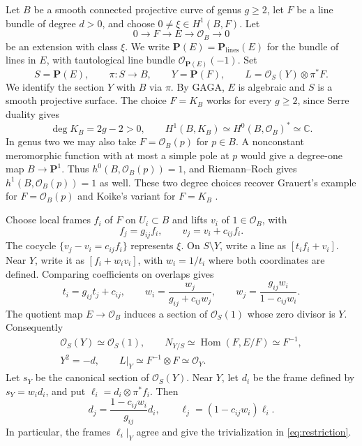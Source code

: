 \documentclass[11pt]{amsart}
\theoremstyle{definition}
\theoremstyle{remark}
\numberwithin{equation}{section}
\newcommand{\C}{\mathbb C}
\newcommand{\PP}{\mathbf P}
\newcommand{\OO}{\mathcal O}
\begin{document}
Let $B$ be a smooth connected projective curve of genus $g\ge2$, let
$F$ be a line bundle of degree $d>0$, and choose
$0\ne\xi\in H^1(B,F)$. Let
\begin{equation}\label{eq:extension-intro}
0\longrightarrow F\longrightarrow E\longrightarrow\OO_B
\longrightarrow0
\end{equation}
be an extension with class $\xi$. We write $\PP(E)=\PP_{\mathrm{lines}}(E)$ for the
bundle of lines in $E$, with tautological line bundle $\OO_{\PP(E)}(-1)$.
Set
\begin{equation}\label{eq:main-line}
 S=\PP(E),\qquad \pi:S\to B,\qquad
 Y=\PP(F),\qquad L=\OO_S(Y)\otimes\pi^*F.
\end{equation}
We identify the section $Y$ with $B$ via $\pi$. By GAGA, $E$ is
algebraic and $S$ is a smooth projective surface. The choice $F=K_B$
works for every $g\ge2$, since Serre duality gives
\[
 \deg K_B=2g-2>0,\qquad
 H^1(B,K_B)\simeq H^0(B,\OO_B)^*\simeq\C.
\]
In genus two we may also take $F=\OO_B(p)$ for $p\in B$.
A nonconstant meromorphic function with at most a simple pole at $p$
would give a degree-one map $B\to\PP^1$. Thus $h^0(B,\OO_B(p))=1$,
and Riemann--Roch gives $h^1(B,\OO_B(p))=1$ as well. These two
degree choices recover Grauert's example for $F=\OO_B(p)$
\cite[\S4, 8(d)]{Grauert1962} and Koike's variant for $F=K_B$
\cite[Example~4.1]{Koike2021}.

Choose local frames $f_i$ of $F$ on $U_i\subset B$ and lifts
$v_i$ of $1\in\OO_B$, with
\[
 f_j=g_{ij}f_i,\qquad v_j=v_i+c_{ij}f_i.
\]
The cocycle $\{v_j-v_i=c_{ij}f_i\}$ represents $\xi$.
On $S\setminus Y$, write a line as $[t_if_i+v_i]$. Near $Y$,
write it as $[f_i+w_iv_i]$, with $w_i=1/t_i$ where both coordinates
are defined. Comparing
coefficients on overlaps gives
\begin{equation}\label{eq:affine-transition}
 t_i=g_{ij}t_j+c_{ij},\qquad
 w_i=\frac{w_j}{g_{ij}+c_{ij}w_j},\qquad
 w_j=\frac{g_{ij}w_i}{1-c_{ij}w_i}.
\end{equation}
The quotient map $E\to\OO_B$ induces a section of
$\OO_S(1)$ whose zero divisor is $Y$. Consequently
\begin{equation}\label{eq:restriction}
 \begin{gathered}
 \OO_S(Y)\simeq\OO_S(1),\qquad
 N_{Y/S}\simeq\operatorname{Hom}(F,E/F)\simeq F^{-1},\\
 Y^2=-d,\qquad L|_Y\simeq F^{-1}\otimes F\simeq\OO_Y.
 \end{gathered}
\end{equation}
Let $s_Y$ be the canonical section of $\OO_S(Y)$. Near $Y$,
let $d_i$ be the frame defined by $s_Y=w_id_i$,
and put $\ell_i=d_i\otimes\pi^*f_i$. Then
\begin{equation}\label{eq:L-transition}
 d_j=\frac{1-c_{ij}w_i}{g_{ij}}d_i,\qquad
 \ell_j=(1-c_{ij}w_i)\ell_i.
\end{equation}
In particular, the frames $\ell_i|_Y$ agree and give the
trivialization in \eqref{eq:restriction}.
\end{document}

